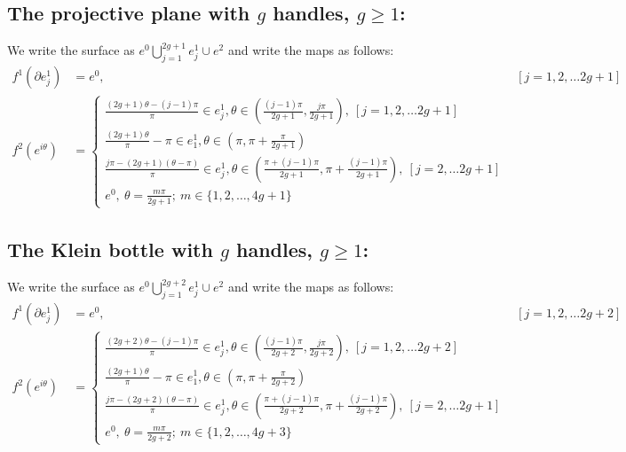 \documentclass[11pt]{article}
\numberwithin{equation}{section}
\begin{document}
 \subsection{\normalsize{The projective plane with $g$ handles, $g\geqslant 1$:}}
We write the surface as $e^0\bigcup_{j=1}^{2g+1}{e^1_j}\cup e^2$ and write the maps as follows: \begin{align*}
         f^1(\partial e^1_j) &= e^0, & [j=1,2,\dots 2g+1]\\ 
         f^2(e^{i\theta})&= \begin{cases} \frac{(2g+1)\theta-(j-1)\pi}{\pi}\in e^1_j, \theta\in\left(\frac{(j-1)\pi}{2g+1},\frac{j\pi}{2g+1}\right),\ [j=1,2,\dots 2g+1] \\ \frac{(2g+1)\theta}{\pi}-\pi\in e^1_1, \theta\in\left(\pi,\pi+\frac{\pi}{2g+1}\right)\\ \frac{j\pi-(2g+1)(\theta-\pi)}{\pi}\in e^1_j, \theta\in\left(\frac{\pi+(j-1)\pi}{2g+1},\pi+\frac{(j-1)\pi}{2g+1}\right),\ [j=2,\dots 2g+1] \\ e^0,\ \theta=\frac{m\pi}{2g+1};\ m\in\{1,2,\dots,4g+1\} \end{cases}
     \end{align*}
\subsection{\normalsize{The Klein bottle with $g$ handles, $g\geqslant 1$:}}
We write the surface as $e^0\bigcup_{j=1}^{2g+2}{e^1_j}\cup e^2$ and write the maps as follows: \begin{align*}
         f^1(\partial e^1_j) &= e^0, & [j=1,2,\dots 2g+2]\\ 
         f^2(e^{i\theta})&= \begin{cases} \frac{(2g+2)\theta-(j-1)\pi}{\pi}\in e^1_j, \theta\in\left(\frac{(j-1)\pi}{2g+2},\frac{j\pi}{2g+2}\right),\ [j=1,2,\dots 2g+2] \\ \frac{(2g+1)\theta}{\pi}-\pi\in e^1_1, \theta\in\left(\pi,\pi+\frac{\pi}{2g+2}\right)\\ \frac{j\pi-(2g+2)(\theta-\pi)}{\pi}\in e^1_j, \theta\in\left(\frac{\pi+(j-1)\pi}{2g+2},\pi+\frac{(j-1)\pi}{2g+2}\right),\ [j=2,\dots 2g+1] \\ e^0,\ \theta=\frac{m\pi}{2g+2};\ m\in\{1,2,\dots,4g+3\} \end{cases}
     \end{align*}
     
\end{document}
